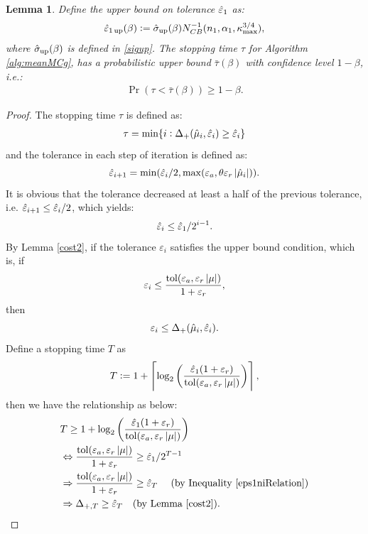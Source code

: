 \documentclass{iitthesis}
\newtheorem{lemma}[theorem]{Lemma}
\begin{document}
\begin{lemma}\label{tauprobbound}
Define the upper bound on tolerance $\hat{\varepsilon}_1$ as:
\begin{align}\label{eps1updef}
\hat{\varepsilon}_{1\operatorname{up}}(\beta):=\hat{\sigma}_{\operatorname{up}}(\beta) N_{CB}^{-1}(n_1,\alpha_1,\kappa_{\max}^{3/4}),
\end{align}
where $\hat{\sigma}_{\operatorname{up}}(\beta)$ is defined in \eqref{sigup}. The stopping time $\tau$ for Algorithm \ref{alg:meanMCg}, has a probabilistic upper bound $\bar{\tau}(\beta)$ with confidence level $1-\beta$, i.e.:
\begin{align}
\Pr(\tau <\bar{\tau}(\beta)) \geq 1-\beta.
\end{align}
\end{lemma}
\begin{proof}
The stopping time $\tau$ is defined as:
 \begin{align}\label{st}
\tau = \min \{ i: \Delta_{+}(\hat{\mu}_i, \hat{\varepsilon}_i) \geq \hat{\varepsilon}_i \}
\end{align}
 and the tolerance in each step of iteration is defined as:
 $$\hat{\varepsilon}_{i+1} = \min(\hat{\varepsilon}_i/2, \max(\varepsilon_a,\theta\varepsilon_r\left \lvert \hat{\mu}_i \right \rvert)).$$ 
 It is obvious that the tolerance decreased at least a half of the previous tolerance, i.e.
$\hat{\varepsilon}_{i+1} \leq\hat{\varepsilon}_i/2$, which yields: 
\begin{align}\label{eps1niRelation}
\hat{\varepsilon}_i \le\hat{\varepsilon}_1/2^{i-1}.
\end{align} 
By Lemma \ref{cost2}, if the tolerance $\varepsilon_i$ satisfies the upper bound condition, which is, if $$\varepsilon_i \leq \frac{\operatorname{tol}(\varepsilon_a, \varepsilon_r\left \lvert \mu \right \rvert)}{1+\varepsilon_r},$$ then
$$\varepsilon_i \leq \Delta_{+}(\hat{\mu}_i, \hat{\varepsilon}_i).$$ 
Define a stopping time $T$ as
$$T := 1+\left \lceil \log_{2} \left(\frac{\hat{\varepsilon}_{1}(1+\varepsilon_r)}{ \operatorname{tol}(\varepsilon_a,\varepsilon_r \left \lvert \mu \right \rvert)}\right) \right \rceil, $$
then we have the relationship as below:
\begin{align}
& T \geq 1+\log_{2} \left(\frac{\heps_{1}(1+\varepsilon_r)}{ \tol(\varepsilon_a,\varepsilon_r \abs{\mu})}\right)\\&
\Leftrightarrow  \frac{\tol(\varepsilon_a, \varepsilon_r\abs{\mu})}{1+\varepsilon_r} \ge \heps_1/2^{T-1}\\
& \Rightarrow \frac{\tol(\varepsilon_a, \varepsilon_r\abs{\mu})}{1+\varepsilon_r} \ge \heps_T  \text{ \quad (by Inequality \eqref{eps1niRelation}})\\&
\Rightarrow \Delta_{+, T} \ge \heps_{T} \text{\quad(by Lemma \ref{cost2})}.

\end{align}
\end{proof}
\end{document}
